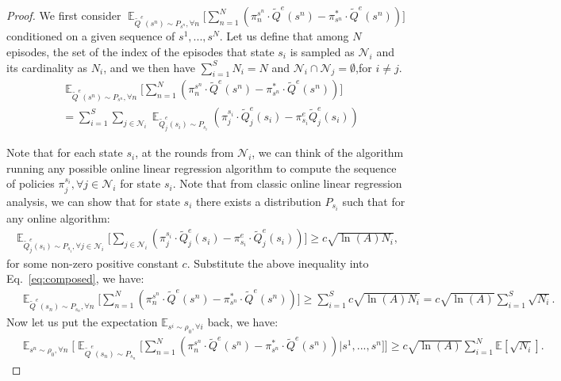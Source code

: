 \documentclass{article}
\begin{document}
\begin{proof}
We first consider $\mathop{\mathbb{E}}_{\tilde{Q}^e(s^n)\sim P_{s^n},\forall n}\big[\sum_{n=1}^N(  \pi_n^{s^n}\cdot \tilde{Q}^e(s^n) - \pi^*_{s^n}\cdot \tilde{Q}^e(s^n))\big]$ conditioned on a given sequence of $s^1,...,s^N$.
Let us define that among $N$ episodes, the set of the index of the episodes that state $s_i$ is sampled as $\mathcal{N}_i$ and its cardinality as $N_i$, and we then have $\sum_{i=1}^S N_i = N$ and $\mathcal{N}_i \cap\mathcal{N}_j = \emptyset$,for $i\neq j$. 
\begin{align}
&\mathop{\mathbb{E}}_{\tilde{Q}^e(s^n)\sim P_{s^n},\forall n}\big[\sum_{n=1}^N(  \pi_n^{s^n}\cdot \tilde{Q}^e(s^n) - \pi^*_{s^n}\cdot \tilde{Q}^e(s^n))\big] \nonumber\\
& = \sum_{i=1}^S \sum_{j\in \mathcal{N}_i} \mathop{\mathbb{E}}_{\tilde{Q}_j^e(s_i)\sim P_{s_i}}(\pi_{j}^{s_i}\cdot\tilde{Q}_j^e(s_i) - \pi_{s_i}^e\tilde{Q}_j^e(s_i))
\label{eq:composed}
\end{align}


Note that for each state $s_i$, at the rounds from $\mathcal{N}_i$, we can think of the algorithm running any possible online linear regression algorithm to compute the sequence of policies $\pi_j^{s_i},\forall j\in \mathcal{N}_i$ for state $s_i$. Note that from classic online linear regression analysis, we can show that for state $s_i$ there exists a distribution $P_{s_i}$ such that for any online algorithm:
\begin{align}
\mathop{\mathbb{E}}_{\tilde{Q}^e_j(s_i)\sim P_{s_i},\forall j\in\mathcal{N}_i}\big[ \sum_{j\in\mathcal{N}_i} (\pi_{j}^{s_i} \cdot \tilde{Q}_j^e(s_i) - \pi_{s_i}^e\cdot \tilde{Q}_j^e(s_i))  \big] \geq c\sqrt{\ln(A) N_i},
\end{align} for some non-zero positive constant $c$.
Substitute the above inequality into Eq.~\ref{eq:composed}, we have:
\begin{align}
&\mathop{\mathbb{E}}_{\tilde{Q}^e(s_n)\sim P_{s_n},\forall n}\big[\sum_{n=1}^N(   \pi_n^{s^n}\cdot \tilde{Q}^e(s^n) -\pi^*_{s^n}\cdot \tilde{Q}^e(s^n))\big]\geq \sum_{i=1}^S c\sqrt{\ln(A)N_i} = c\sqrt{\ln(A)}\sum_{i=1}^S\sqrt{N_i}.
\end{align}
Now let us put the expectation $\mathbb{E}_{s^i\sim\rho_0,\forall i}$ back, we have:
\begin{align}
\label{eq:fact_1}
&\mathop{\mathbb{E}}_{s^n\sim\rho_0,\forall n}\Big[\mathop{\mathbb{E}}_{\tilde{Q}^e(s_n)\sim P_{s_n}}\big[\sum_{n=1}^N( \pi_n^{s^n}\cdot \tilde{Q}^e(s^n) - \pi^*_{s^n}\cdot \tilde{Q}^e(s^n))|s^1,...,s^n\big]\Big]\geq  c\sqrt{\ln(A)}\sum_{i=1}^N\mathbb{E}[\sqrt{N_i}].
\end{align}


\end{proof}
\end{document}

